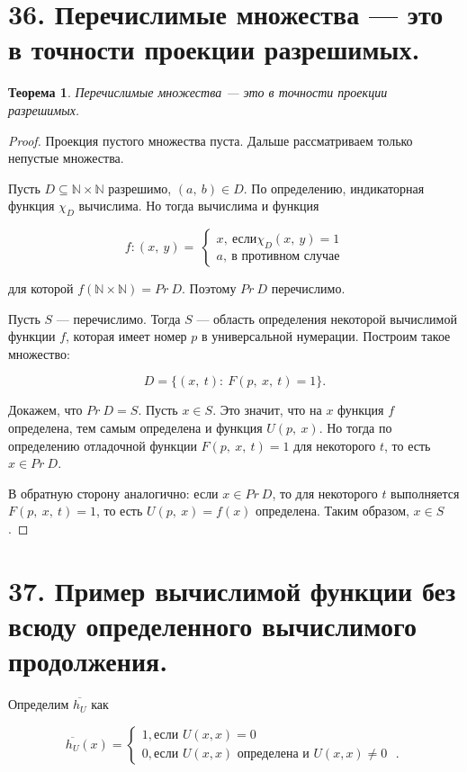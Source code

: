 \documentclass[a4paper, 12pt]{article}
\newtheorem*{theorem}{Теорема}
\newcommand{\N}{\mathbb{N}}
\begin{document}
\section*{36. Перечислимые множества — это в точности проекции разрешимых.}

\begin{theorem}
    Перечислимые множества — это в точности проекции разрешимых.
\end{theorem}

\begin{proof}
Проекция пустого множества пуста. Дальше рассматриваем только непустые множества.
    
Пусть $D \subseteq \N \times \N$ разрешимо, $(a,\ b) \in D$. По определению, индикаторная функция $\chi_D$ вычислима. Но тогда вычислима и функция

\[
    f: (x,\ y) =\  
    \begin{cases}
        x,\ \text{если} \chi_D(x,\ y) = 1 \\
        a,\ \text{в противном случае}
    \end{cases}
\]

для которой $f(\N \times \N) = Pr\ D$. Поэтому $Pr\ D$ перечислимо.

Пусть $S$ — перечислимо. Тогда $S$ — область определения некоторой вычислимой
функции $f$, которая имеет номер $p$ в универсальной нумерации. Построим такое
множество:

\[
    D = \{(x,\ t) :\  F(p,\ x,\ t) = 1\}.
\]

Докажем, что $Pr\ D = S$. Пусть $x \in S$. Это значит, что на $x$ функция $f$ определена, тем самым определена и функция $U(p,\ x)$. Но тогда по определению отладочной функции $F(p,\ x,\ t) = 1$ для некоторого $t$, то есть $x \in Pr\ D$.

В обратную сторону аналогично: если $x \in Pr\ D$, то для некоторого $t$ выполняется $F(p,\ x,\ t) = 1$, то есть $U(p,\ x) = f(x)$ определена. Таким образом, $x \in S$.

\end{proof}

\section*{37. Пример вычислимой функции без всюду определенного вычислимого продолжения.}

Определим $\overline{h_U}$ как

    \[
        \overline{h_{U}}(x) =
        \begin{cases}
            1, \text{если $U(x, x) = 0$} \\
            0, \text{если $U(x, x)$ определена и $U(x, x) \neq 0$ }.
        \end{cases}
    \]
\end{document}
